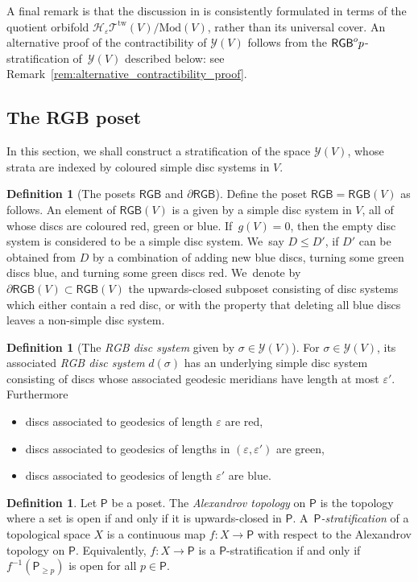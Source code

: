 \documentclass[11pt]{article}
\theoremstyle{plain}
\theoremstyle{definition}
\newtheorem{defn}[thm]{Definition}
\let\eps\varepsilon
\newcommand{\TT}{\mathcal T^{\mathrm{tw}}}
\newcommand{\Y}{\mathcal Y}
\newcommand{\RGB}{{\mathsf{RGB}}}
\newcommand{\dRGB}{\partial\mathsf{RGB}}
\newcommand{\Po}{\mathsf{P}}
\newcommand{\hmod}{\mathrm{Mod}}
\begin{document}
A final remark is that the discussion in \cite{hainautpetersen} is consistently formulated in terms of the quotient orbifold $\mathcal{H}_\eps\TT(V)/\hmod(V)$, rather than its universal cover. An alternative proof of the contractibility of $\Y(V)$ follows from the $\RGB^\textnormal{op}$-stratification of~$\Y(V)$ described below: see Remark~\ref{rem:alternative_contractibility_proof}.

\subsection{The RGB poset}

In this section, we shall construct a stratification of the space $\mathcal Y(V)$, whose strata are indexed by coloured simple disc systems in $V$.

\begin{defn}[The posets $\RGB$ and $\dRGB$] Define the poset $\RGB=\RGB(V)$ as follows. An element of $\RGB(V)$ is a given by a simple disc system in $V$, all of whose discs are coloured red, green or blue. If~$g(V)=0$, then the empty disc system is considered to be a simple disc system. We~say $D \leq D'$, if $D'$ can be obtained from $D$ by a combination of adding new blue discs, turning some green discs blue, and turning some green discs red. We~denote by $\dRGB(V) \subset \RGB(V)$ the upwards-closed subposet consisting of disc systems which either contain a red disc, or with the property that deleting all blue discs leaves a non-simple disc system.
\end{defn}

\begin{defn}[The \emph{RGB disc system} given by $\sigma \in \mathcal{Y}(V)$] \label{def of RGB stratification}
For $\sigma \in \mathcal{Y}(V)$, its associated \emph{RGB disc system} $d(\sigma)$ has an underlying simple disc system consisting of discs whose associated geodesic meridians have length at most $\eps'$. Furthermore
\begin{itemize}
	\item discs associated to geodesics of length $\eps$ are red,
	\item discs associated to geodesics of lengths in $(\eps,\eps')$ are green,
	\item discs associated to geodesics of length $\eps'$ are blue.
\end{itemize}
\end{defn}

\begin{defn}
Let $\Po$ be a poset. The \emph{Alexandrov topology} on $\Po$ is the topology where a set is open if and only if it is upwards-closed in $\Po$. A~\emph{$\Po$-stratification} of a topological space $X$ is a continuous map $f \colon X \to \Po$ with respect to the Alexandrov topology on $\Po$. Equivalently, $f \colon X \to \Po$ is a $\Po$-stratification if and only if $f^{-1}(\Po_{\geq p})$ is open for all $p \in \Po$.
\end{defn}
\end{document}
